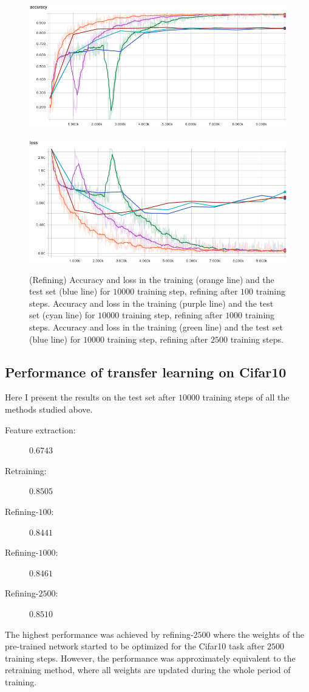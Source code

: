 \documentclass{article}
\begin{document}
\begin{figure}[h!]
\centering
\includegraphics[width=12.2cm]{acc-refine.png}\	
\includegraphics[width=12.2cm]{loss-refine.png}
\caption{(Refining) Accuracy and loss in the training (orange line) and the test set (blue line) for $10000$ training step, refining after $100$ training steps.
Accuracy and loss in the training (purple line) and the test set (cyan line) for $10000$ training step, refining after $1000$ training steps.
Accuracy and loss in the training (green line) and the test set (blue line) for $10000$ training step, refining after $2500$ training steps.}
\label{fig:refine}
\end{figure}


\subsection{Performance of transfer learning on Cifar10}

Here I present the results on the test set after $10000$ training steps of all the methods studied above.
\begin{description}
\item[Feature extraction:]{$0.6743$}
\item[Retraining:]{$0.8505$}
\item[Refining-$100$:]{$0.8441$}
\item[Refining-$1000$:]{$0.8461$}
\item[Refining-$2500$:]{$\mathbf{0.8510}$}
\end{description}
The highest performance was achieved by refining-$2500$ where the weights of the pre-trained network started to be optimized for the Cifar10 task after $2500$ training steps.
However, the performance was approximately equivalent to the retraining method, where all weights are updated during the whole period of training.
\end{document}
